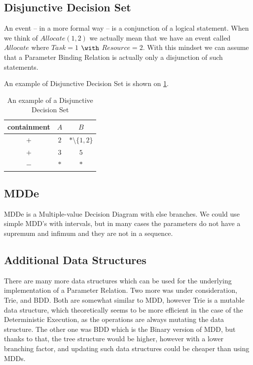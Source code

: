 	\subsection{Disjunctive Decision Set}

	An event -- in a more formal way -- is a conjunction of a logical statement. When we think of $\mathit{Allocate}(1,2)$ we actually mean that we have an event called $\mathit{Allocate}$ where $\mathit{Task} = 1 $ $\with$ $\mathit{Resource} = 2$.
	With this mindset we can assume that a Parameter Binding Relation is actually only a disjunction of such statements.
	
	An example of Disjunctive Decision Set is shown on \cref{tab:cep:dds}.
	
	\begin{table}
		\centering
		\caption{An example of a Disjunctive Decision Set}		
		\label{tab:cep:dds}
		\begin{tabular}{ccc}
			\toprule
			containment &  $A$   &          $B$           \\ \midrule
			    $+$     &  $2$   & $\ast\setminus\{1,2\}$ \\
			    $+$     &  $3$   &          $5$           \\
			    $-$     & $\ast$ &         $\ast$         \\ \bottomrule
		\end{tabular}
	\end{table}

	\subsection{MDDe}
	
	MDDe is a Multiple-value Decision Diagram with else branches. We could use simple MDD's with intervals, but in many cases the parameters do not have a supremum and infimum and they are not in a sequence.
	

	
		\subsection{Additional Data Structures}
		
		There are many more data structures which can be used for the underlying implementation of a Parameter Relation. Two more was under consideration, Trie, and BDD. Both are somewhat similar to MDD, however Trie is a mutable data structure, which theoretically seems to be more efficient in the case of the Deterministic Execution, as the operations are always mutating the data structure. The other one was BDD which is the Binary version of MDD, but thanks to that, the tree structure would be higher, however with a lower branching factor, and updating such data structures could be cheaper than using MDDs.
	
